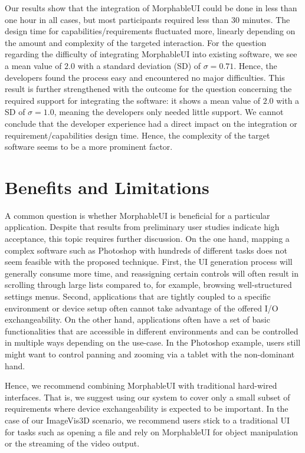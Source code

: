 \documentclass[twoside,twocolumn,10pt]{article}
\begin{document}
Our results show that the integration of MorphableUI could be done in less than one hour in all cases, but most participants required less than 30 minutes. The design time for capabilities/requirements fluctuated more, linearly depending on the amount and complexity of the targeted interaction. For the question regarding the difficulty of integrating MorphableUI into existing software, we see a mean value of $2.0$ with a standard deviation (SD) of $\sigma = 0.71$. Hence, the developers found the process easy and encountered no major difficulties. This result is further strengthened with the outcome for the question concerning the required support for integrating the software: it shows a mean value of $2.0$ with a SD of $\sigma = 1.0$, meaning the developers only needed little support.
We cannot conclude that the developer experience had a direct impact on the integration or requirement/capabilities design time. Hence, the complexity of the target software seems to be a more prominent factor.


\section{Benefits and Limitations} \label{limit}
%
%
A common question is whether MorphableUI is beneficial for a particular application. Despite that results from preliminary user studies indicate high acceptance, this topic requires further discussion.
On the one hand, mapping a complex software such as Photoshop with hundreds of different tasks does not seem feasible with the proposed technique.
First, the UI generation process will generally consume more time, and reassigning certain controls will often result in scrolling through large lists compared to, for example, browsing well-structured settings menus.
Second, applications that are tightly coupled to a specific environment or device setup often cannot take advantage of the offered I/O exchangeability.
On the other hand, applications often have a set of basic functionalities that are accessible in different environments and can be controlled in multiple ways depending on the use-case. In the Photoshop example, users still might want to control panning and zooming via a tablet with the non-dominant hand.

Hence, we recommend combining MorphableUI with traditional hard-wired interfaces. That is, we suggest using our system to cover only a small subset of requirements where device exchangeability is expected to be important. In the case of our ImageVis3D scenario, we recommend users stick to a traditional UI for tasks such as opening a file and rely on MorphableUI for object manipulation or the streaming of the video output.
\end{document}
